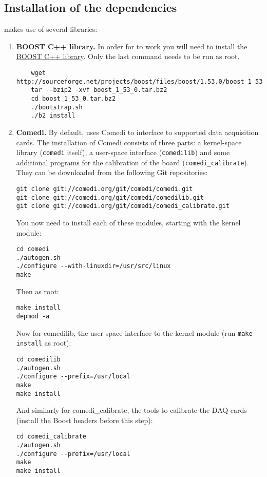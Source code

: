 \subsection{Installation of the dependencies}
\label{install:required}
\progname makes use of several libraries:
\begin{enumerate}
\item \textbf{BOOST C++ library.}
  In order for \progname to work you will need to install the
  \href{http://www.boost.org}{BOOST C++ library}. Only the last
  command needs to be run as root.
  \begin{lstlisting}
    wget http://sourceforge.net/projects/boost/files/boost/1.53.0/boost_1_53_0.tar.bz2
    tar --bzip2 -xvf boost_1_53_0.tar.bz2
    cd boost_1_53_0.tar.bz2
    ./bootstrap.sh
    ./b2 install
  \end{lstlisting}
\item \textbf{Comedi.}
By default, \progname uses Comedi to interface to supported data
acquisition cards. The installation of Comedi consists of three parts:
a kernel-space library (\texttt{comedi} itself), a user-space
interface (\texttt{comedilib}) and some additional programs for the
calibration of the board (\texttt{comedi\_calibrate}). They can be
downloaded from the following Git repositories:
\begin{lstlisting}
git clone git://comedi.org/git/comedi/comedi.git
git clone git://comedi.org/git/comedi/comedilib.git
git clone git://comedi.org/git/comedi/comedi_calibrate.git
\end{lstlisting}
You now need to install each of these modules, starting with the kernel module:
\begin{lstlisting}
cd comedi
./autogen.sh
./configure --with-linuxdir=/usr/src/linux
make
\end{lstlisting}
Then as root:
\begin{lstlisting}
make install
depmod -a
\end{lstlisting}
Now for comedilib, the user space interface to the kernel module (run \texttt{make install} as root):
\begin{lstlisting}
cd comedilib
./autogen.sh
./configure --prefix=/usr/local
make
make install
\end{lstlisting}
And similarly for comedi\_calibrate, the tools to calibrate the DAQ cards (install the Boost headers before this step):
\begin{lstlisting}
cd comedi_calibrate
./autogen.sh
./configure --prefix=/usr/local
make
make install
\end{lstlisting}

\end{enumerate}
